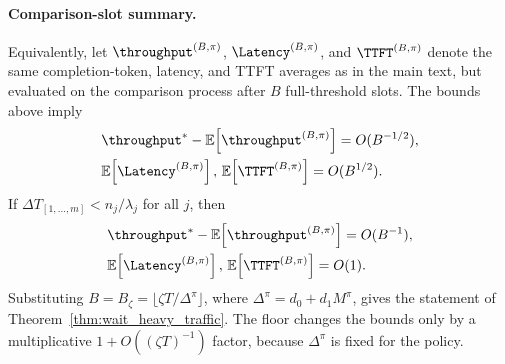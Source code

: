 \paragraph{Comparison-slot summary.}
Equivalently, let \(\throughput^{(B,\pi)}\), \(\Latency^{(B,\pi)}\), and \(\TTFT^{(B,\pi)}\) denote the same completion-token, latency, and TTFT averages as in the main text, but evaluated on the comparison process after \(B\) full-threshold slots. The bounds above imply
\[
\begin{aligned}
&\throughput^*-\mathbb{E}\!\left[\throughput^{(B,\pi)}\right]=O(B^{-1/2}),\\
&\mathbb{E}\!\left[\Latency^{(B,\pi)}\right],\,
  \mathbb{E}\!\left[\TTFT^{(B,\pi)}\right]=O(B^{1/2}).
\end{aligned}
\]
If \(\Delta T_{[1,\ldots,m]}<n_j/\lambda_j\) for all \(j\), then
\[
\begin{aligned}
&\throughput^*-\mathbb{E}\!\left[\throughput^{(B,\pi)}\right]=O(B^{-1}),\\
&\mathbb{E}\!\left[\Latency^{(B,\pi)}\right],\,
  \mathbb{E}\!\left[\TTFT^{(B,\pi)}\right]=O(1).
\end{aligned}
\]
Substituting \(B=B_\zeta=\lfloor \zeta T/\Delta^\pi\rfloor\), where \(\Delta^\pi=d_0+d_1M^\pi\), gives the statement of Theorem~\ref{thm:wait_heavy_traffic}. The floor changes the bounds only by a multiplicative \(1+O((\zeta T)^{-1})\) factor, because \(\Delta^\pi\) is fixed for the policy.
